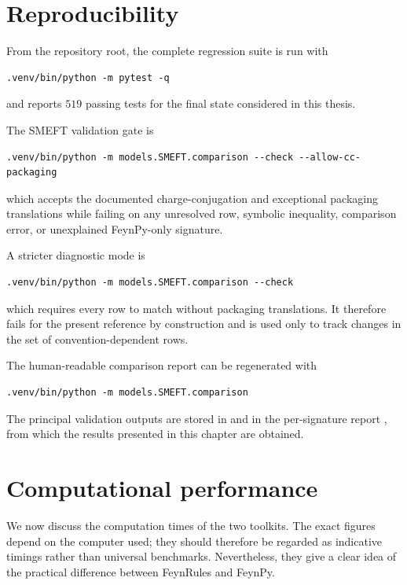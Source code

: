 \section{Reproducibility}
\label{sec:validation-reproducibility}

From the repository root, the complete regression suite is run with
\begin{verbatim}
.venv/bin/python -m pytest -q
\end{verbatim}
and reports $519$ passing tests for the final state considered in this thesis.

The SMEFT validation gate is
\begin{verbatim}
.venv/bin/python -m models.SMEFT.comparison --check --allow-cc-packaging
\end{verbatim}
which accepts the documented charge-conjugation and exceptional packaging translations while failing on any unresolved row, symbolic inequality, comparison error, or unexplained FeynPy-only signature.

A stricter diagnostic mode is
\begin{verbatim}
.venv/bin/python -m models.SMEFT.comparison --check
\end{verbatim}
which requires every row to match without packaging translations. It therefore fails for the present reference by construction and is used only to track changes in the set of convention-dependent rows.

The human-readable comparison report can be regenerated with
\begin{verbatim}
.venv/bin/python -m models.SMEFT.comparison
\end{verbatim}

The principal validation outputs are stored in  and in the per-signature report , from which the results presented in this chapter are obtained.


\section{Computational performance}
\label{sec:validation-performance}

We now discuss the computation times of the two toolkits. The exact figures depend on the computer used; they should therefore be regarded as indicative timings rather than universal benchmarks. Nevertheless, they give a clear idea of the practical difference between FeynRules and FeynPy.

